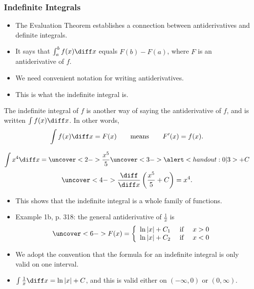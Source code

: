 \begin{frame}\frametitle{Indefinite Integrals}
\begin{itemize}
\item  The Evaluation Theorem establishes a connection between antiderivatives and definite integrals.
\item  It says that $\int_a^b f(x)\diff x$ equals $F(b) - F(a)$, where $F$ is an antiderivative of $f$.
\item  We need convenient notation for writing antiderivatives.
\item  This is what the indefinite integral is.
\end{itemize}
\begin{definition}
The indefinite integral of $f$ is another way of saying the antiderivative of $f$, and is written $\int f(x) \diff x$.  In other words,
\abovedisplayskip=0pt
\belowdisplayskip=0pt
\[
\int f(x) \diff x = F(x) \qquad \text{means}\qquad F'(x) = f(x).
\]
\end{definition}
\end{frame}

\begin{frame}
\begin{example}
\abovedisplayskip=0pt
\belowdisplayskip=0pt
\[
\int x^4 \diff x = \uncover<2->{\frac{x^5}{5}} \uncover<3->{\alert<handout:0| 3>{+ C}}
\]
\abovedisplayskip=0pt
\belowdisplayskip=0pt
\[
\uncover<4->{\frac{\diff}{\diff x}\left( \frac{x^5}{5} + C\right) = x^4.}
\]
\end{example}
\begin{itemize}
\item<5->  This shows that the indefinite integral is a whole family of functions.
\item<6->  Example 1b, p. 318:  the general antiderivative of $\frac{1}{x}$ is
\abovedisplayskip=0pt
\belowdisplayskip=0pt
\[
\uncover<6->{%
F(x) = \left\{ \begin{array}{ccc}
\ln |x| + C_1 & \text{ if } & x > 0\\
\ln |x| + C_2 & \text{ if } & x < 0
\end{array}\right.
}%
\]
\item<7->  We adopt the convention that the formula for an indefinite integral is only valid on one interval.
\item<8->  $\int \frac{1}{x} \diff x = \ln |x| + C$, and this is valid either on $(-\infty , 0)$ or $(0, \infty)$.
\end{itemize}
\end{frame}
